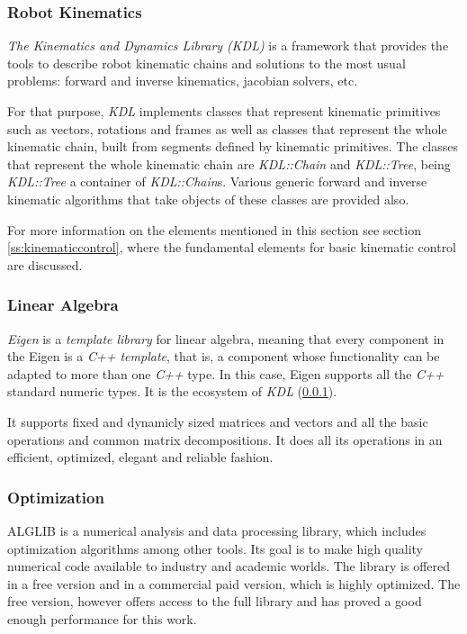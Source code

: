 \subsubsection{Robot Kinematics}
\label{sss:KDL}

\textit{The Kinematics and Dynamics Library (KDL)} \cite{KDL} is a framework that provides the tools to describe robot kinematic chains and solutions to the most usual problems: forward and inverse kinematics, jacobian solvers, etc.

For that purpose, \textit{KDL} implements classes that represent kinematic primitives such as vectors, rotations and frames as well as classes that represent the whole kinematic chain, built from segments defined by kinematic primitives. The classes that represent the whole kinematic chain are \textit{KDL::Chain} and \textit{KDL::Tree}, being \textit{KDL::Tree} a container of \textit{KDL::Chain}s. Various generic forward and inverse kinematic algorithms that take objects of these classes are provided also.

For more information on the elements mentioned in this section see section \ref{ss:kinematiccontrol}, where the fundamental elements for basic kinematic control are discussed.

\subsubsection{Linear Algebra}

\textit{Eigen} \cite{eigen} is a \textit{template library} for linear algebra, meaning that every component in the Eigen is a \textit{C++ template}, that is, a component whose functionality can be adapted to more than one \textit{C++} type. In this case, Eigen supports all the \textit{C++} standard numeric types. It is the ecosystem of \textit{KDL} (\ref{sss:KDL}).

It supports fixed and dynamicly sized matrices and vectors and all the basic operations and common matrix decompositions. It does all its operations in an efficient, optimized, elegant and reliable fashion.

\subsubsection{Optimization}

ALGLIB \cite{alglib} is a numerical analysis and data processing library, which includes optimization algorithms among other tools. Its goal is to make high quality numerical code available to industry and academic worlds. The library is offered in a free version and in a commercial paid version, which is highly optimized. The free version, however offers access to the full library and has proved a good enough performance for this work.

